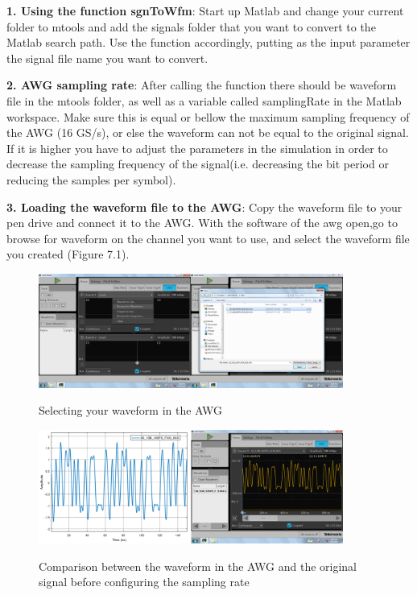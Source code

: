 \textbf{1. Using the function sgnToWfm}:
Start up Matlab and change your current folder to mtools and add the signals folder that you want to convert to the Matlab search path. Use the function accordingly, putting as the input parameter the signal file name you want to convert.
\bigskip

\noindent
\textbf{2. AWG sampling rate}:
After calling the function there should be waveform file in the mtools folder, as well as a variable called samplingRate in the Matlab workspace. Make sure this is equal or bellow the maximum sampling frequency of the AWG (16 GS/s), or else the waveform can not be equal to the original signal. If it is higher you  have to adjust the parameters in the simulation in order to decrease the sampling frequency of the signal(i.e. decreasing the bit period or reducing the samples per symbol).
\bigskip

\noindent
\textbf{3. Loading the waveform file to the AWG}:
Copy the waveform file to your pen drive and connect it to the AWG. With the software of the awg open,go to browse for waveform on the channel you want to use, and select the waveform file you created (Figure 7.1).

\begin{figure}[h]
	\centering
	\includegraphics[width=10cm]{../mtools/sgnToWfm/figures/tutorial1}
	\label{TUT_SelectingWFM}\caption{Selecting your waveform in the AWG}
\end{figure}
\begin{figure}[h]
	\centering
	\includegraphics[width=10cm]{../mtools/sgnToWfm/figures/tutorial2}
	\label{TUT_CompBad}\caption{Comparison between the waveform in the AWG and the original signal before configuring the sampling rate}
\end{figure}

